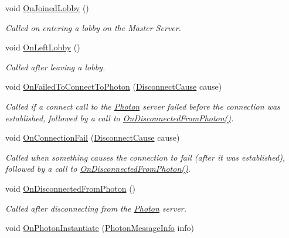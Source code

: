 \begin{DoxyCompactItemize}
void \hyperlink{interface_i_pun_callbacks_affec2831a07b42447ac47919104c608e}{On\+Joined\+Lobby} ()
\begin{DoxyCompactList}\small\item\em Called on entering a lobby on the Master Server. \end{DoxyCompactList}\item 
void \hyperlink{interface_i_pun_callbacks_a74de405ce9dff20613c31ce891090f49}{On\+Left\+Lobby} ()
\begin{DoxyCompactList}\small\item\em Called after leaving a lobby. \end{DoxyCompactList}\item 
void \hyperlink{interface_i_pun_callbacks_a12268b49cbab2203f8b664c7bef4655a}{On\+Failed\+To\+Connect\+To\+Photon} (\hyperlink{group__public_api_gad61b1461cf60ad9e8d86923d111d5cc9}{Disconnect\+Cause} cause)
\begin{DoxyCompactList}\small\item\em Called if a connect call to the \hyperlink{namespace_photon}{Photon} server failed before the connection was established, followed by a call to \hyperlink{interface_i_pun_callbacks_ac345f1ed2f24bcc73593988f1ac44f7d}{On\+Disconnected\+From\+Photon()}. \end{DoxyCompactList}\item 
void \hyperlink{interface_i_pun_callbacks_a49f4cfb7c0e2c51ec71b8f52c7413b31}{On\+Connection\+Fail} (\hyperlink{group__public_api_gad61b1461cf60ad9e8d86923d111d5cc9}{Disconnect\+Cause} cause)
\begin{DoxyCompactList}\small\item\em Called when something causes the connection to fail (after it was established), followed by a call to \hyperlink{interface_i_pun_callbacks_ac345f1ed2f24bcc73593988f1ac44f7d}{On\+Disconnected\+From\+Photon()}. \end{DoxyCompactList}\item 
void \hyperlink{interface_i_pun_callbacks_ac345f1ed2f24bcc73593988f1ac44f7d}{On\+Disconnected\+From\+Photon} ()
\begin{DoxyCompactList}\small\item\em Called after disconnecting from the \hyperlink{namespace_photon}{Photon} server. \end{DoxyCompactList}\item 
void \hyperlink{interface_i_pun_callbacks_a28ef052b776a594b305b08d7e80b6df3}{On\+Photon\+Instantiate} (\hyperlink{class_photon_message_info}{Photon\+Message\+Info} info)

\end{DoxyCompactItemize}
